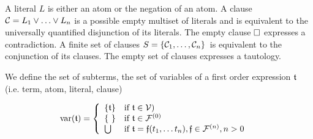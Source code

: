 
\begin{definition}\label{def:literals}
A {\myem literal} $L$ is either an atom or the negation of an atom.
%
A {\myem clause}\ \ ${\mathcal C} = L_1\lor\ldots\lor L_n$  is a possible empty multiset of literals 
and is equivalent to the universally quantified disjunction of its literals.
The {\myem empty clause} $\square$ expresses a contradiction. 
%
A finite {\myem set of clauses} $S=\{ {\mathcal C}_1,\ldots,{\mathcal C}_n \}$ is equivalent to the conjunction of its clauses.
The empty set of clauses expresses a tautology.

\end{definition}

\begin{definition}We define the set of subterms, the set of variables of a first order expression ${\mathfrak t}$ (i.e. term, atom, literal, clause)
	
	\begin{align*}
		\operatorname{var}({\mathfrak t}) &= \left\{\begin{array}{ll}
			\{ {\mathfrak t} \} & \text{if } {\mathfrak t}  \in {\mathcal V})\\
			\{\ \} &\text{if } {\mathfrak t} \in {\mathcal F^{(0)}}\\
			\bigcup & \text{if }  {\mathfrak t} = {\mathfrak f}(t_1, \ldots t_n), {\mathfrak f} \in {\mathcal F^{(n)}}, n > 0
		\end{array}\right.	
	\end{align*}
	
\end{definition}
